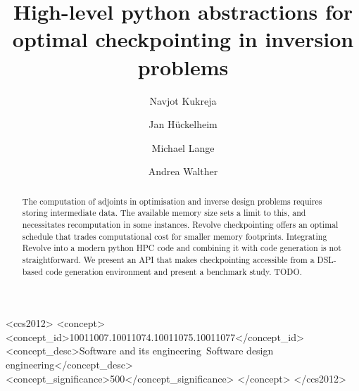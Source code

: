 \documentclass[sigconf]{acmart}
\begin{document}
\title{High-level python abstractions for optimal checkpointing in inversion problems}


\author{Navjot Kukreja}
\author{Jan H\"uckelheim}
\author{Michael Lange}
\author{Andrea Walther}

\renewcommand\shortauthors{Kukreja, N. et al}

\begin{abstract}
The computation of adjoints in optimisation and inverse design problems requires storing intermediate data. The available memory size sets a limit to this, and necessitates recomputation in some instances. Revolve checkpointing offers an optimal schedule that trades computational cost for smaller memory footprints. Integrating Revolve into a modern python HPC code and combining it with code generation is not straightforward. We present an API that makes checkpointing accessible from a DSL-based code generation environment and present a benchmark study. TODO.
\end{abstract}

%
%
\begin{CCSXML}
<ccs2012>
<concept>
<concept_id>10011007.10011074.10011075.10011077</concept_id>
<concept_desc>Software and its engineering~Software design engineering</concept_desc>
<concept_significance>500</concept_significance>
</concept>
</ccs2012>
\end{CCSXML}

%
%




\maketitle
\end{document}
